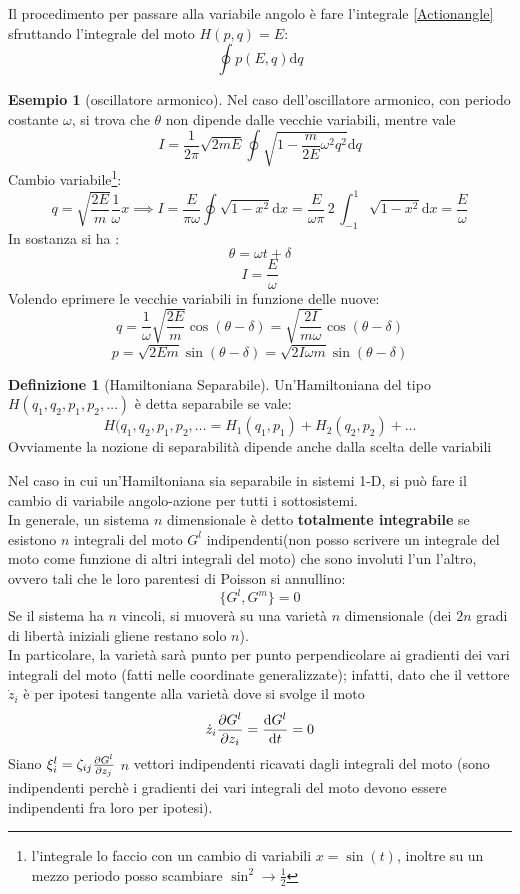 \documentclass[a4paper,12pt]{article}
\theoremstyle{plain}
\theoremstyle{definition}
\newtheorem{defn}{Definizione}[section]
\newtheorem{exmp}{Esempio}[section]
\newcommand{\f}[2]{\frac{#1}{#2}}
\renewcommand{\d}{\text{d}}
\newcommand{\ra}{\rightarrow}
\theoremstyle{remark}
\begin{document}
Il procedimento per passare alla variabile angolo è fare l'integrale \ref{Actionangle} sfruttando l'integrale del moto $H(p,q)=E$:\[\oint 	p(E,q) \d q		\] 
\begin{exmp}[oscillatore armonico]\label{exmp1}
	Nel caso dell'oscillatore armonico, con periodo costante $\omega$, si trova che $\theta$ non dipende dalle vecchie variabili, mentre vale 
	\[I=\f{1}{2\pi} \sqrt{{2m}{E}}\oint {\sqrt{1-\f{m}{2 E} \omega^2 q^2}}	\d 	q	\]
	Cambio variabile\footnote{l'integrale lo faccio con un cambio di variabili $x=\sin(t)$, inoltre su un mezzo periodo posso scambiare $\sin^2\ra\f{1}{2}$}:
	\[q=\sqrt{\f{2 E}{m}}\f{1}{\omega} x\implies I=\f{
	E}{\pi\omega} \oint {\sqrt{1-x^2}}	{\d x}=\f{
	E}{\omega\pi}\,2\,\int_{-1}^1 {\sqrt{1-x^2}}	{\d x}=\f{E}{\omega}	\]
In sostanza si ha :
\[\theta=\omega t+\delta\]
\[I=\f{E}{\omega}\]
Volendo eprimere le vecchie variabili in funzione delle nuove:
\[q=\f{1}{\omega}\sqrt{\f{2E}{m}} \cos(\theta-\delta) 	=\sqrt{\f{2I}{m\omega}} \cos(\theta-\delta) 		\]
\[p=\sqrt{{2E}{m}} \sin(\theta-\delta)=\sqrt{{2I\omega}{m}} \sin(\theta-\delta) 	\]
\end{exmp}
\begin{defn}[Hamiltoniana Separabile]
	Un'Hamiltoniana del tipo $H(q_1,q_2,p_1,p_2,\ldots)$ è detta separabile se vale:
	\[H(q_1,q_2,p_1,p_2,\ldots=H_1(q_1,p_1)+H_2(q_2,p_2)+\ldots\]
	Ovviamente la nozione di separabilità dipende anche dalla scelta delle variabili
	
\end{defn}
Nel caso in cui un'Hamiltoniana sia separabile in sistemi 1-D, si può fare il cambio di variabile angolo-azione per tutti i sottosistemi. \\
In generale, un sistema $n$ dimensionale è detto \textbf{totalmente integrabile}  se esistono $n$ integrali del moto $G^l$ indipendenti(non posso scrivere un integrale del moto come funzione di altri integrali del moto) che sono involuti l'un l'altro, ovvero tali che le loro parentesi di Poisson si annullino:
\[\{G^l,G^m\}=0\]
Se il sistema ha $n$ vincoli, si muoverà su una varietà $n$ dimensionale (dei $2n $ gradi di libertà iniziali gliene restano solo $n$).\\
In particolare, la varietà sarà punto per punto perpendicolare ai gradienti dei vari integrali del moto (fatti nelle coordinate generalizzate); infatti, dato che il vettore $\dot{z}_i$ è per ipotesi tangente alla varietà dove si svolge il moto
\[\dot{z}_i\pdv{G^l}{z_i}=\dv{ G^l}{t}=0\]
Siano $\xi^l_i=\zeta_{ij}\pdv{G^l}{z_j}$ $n$ vettori indipendenti ricavati dagli integrali del moto (sono indipendenti perchè i gradienti dei vari integrali del moto devono essere indipendenti fra loro per ipotesi).
\end{document}
